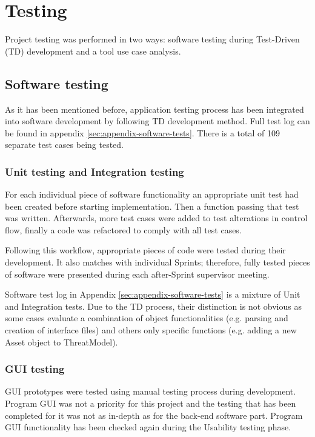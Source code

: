 \section{Testing}\label{testing}
Project testing was performed in two ways: software testing during Test-Driven (TD) development and a tool use case analysis. 

\subsection{Software testing}
	As it has been mentioned before, application testing process has been integrated into software development by following TD development method. Full test log can be found in appendix \ref{sec:appendix-software-tests}. There is a total of 109 separate test cases being tested.

	\subsubsection{Unit testing and Integration testing}
	For each individual piece of software functionality an appropriate unit test had been created before starting implementation. Then a function passing that test was written. Afterwards, more test cases were added to test alterations in control flow, finally a code was refactored to comply with all test cases.
	
	Following this workflow, appropriate pieces of code were tested during their development. It also matches with individual Sprints; therefore, fully tested pieces of software were presented during each after-Sprint supervisor meeting.
	
	Software test log in Appendix \ref{sec:appendix-software-tests} is a mixture of Unit and Integration tests. Due to the TD process, their distinction is not obvious as some cases evaluate a combination of object functionalities (e.g. parsing and creation of interface files) and others only specific functions (e.g. adding a new Asset object to ThreatModel).


	\subsubsection{GUI testing}
	GUI prototypes were tested using manual testing process during development. Program GUI was not a priority for this project and the testing that has been completed for it was not as in-depth as for the back-end software part. Program GUI functionality has been checked again during the Usability testing phase.


